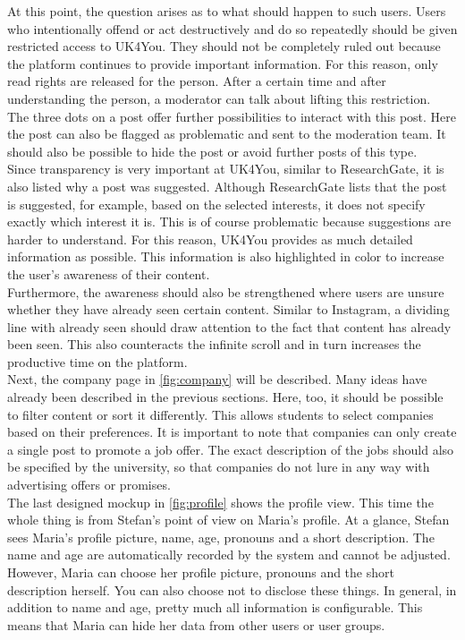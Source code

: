 At this point, the question arises as to what should happen to such users.
Users who intentionally offend or act destructively and do so repeatedly should be given restricted access to UK4You.
They should not be completely ruled out because the platform continues to provide important information.
For this reason, only read rights are released for the person.
After a certain time and after understanding the person, a moderator can talk about lifting this restriction.\\

The three dots on a post offer further possibilities to interact with this post.
Here the post can also be flagged as problematic and sent to the moderation team.
It should also be possible to hide the post or avoid further posts of this type.\\

Since transparency is very important at UK4You, similar to ResearchGate, it is also listed why a post was suggested.
Although ResearchGate lists that the post is suggested, for example, based on the selected interests, it does not specify exactly which interest it is.
This is of course problematic because suggestions are harder to understand. 
For this reason, UK4You provides as much detailed information as possible.
This information is also highlighted in color to increase the user's awareness of their content.\\

Furthermore, the awareness should also be strengthened where users are unsure whether they have already seen certain content.
Similar to Instagram, a dividing line with already seen should draw attention to the fact that content has already been seen.
This also counteracts the infinite scroll and in turn increases the productive time on the platform.\\

Next, the company page in \autoref{fig:company} will be described.
Many ideas have already been described in the previous sections.
Here, too, it should be possible to filter content or sort it differently. 
This allows students to select companies based on their preferences.
It is important to note that companies can only create a single post to promote a job offer.
The exact description of the jobs should also be specified by the university, so that companies do not lure in any way with advertising offers or promises.\\

The last designed mockup in \autoref{fig:profile} shows the profile view.
This time the whole thing is from Stefan's point of view on Maria's profile.
At a glance, Stefan sees Maria's profile picture, name, age, pronouns and a short description.
The name and age are automatically recorded by the system and cannot be adjusted.
However, Maria can choose her profile picture, pronouns and the short description herself.
You can also choose not to disclose these things.
In general, in addition to name and age, pretty much all information is configurable.
This means that Maria can hide her data from other users or user groups.\\

